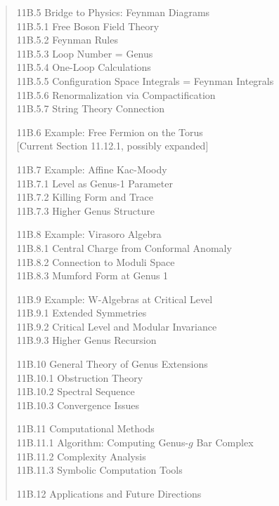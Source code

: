 \begin{quote}
11B.5 Bridge to Physics: Feynman Diagrams \\
\phantom{11B.5} 11B.5.1 Free Boson Field Theory \\
\phantom{11B.5} 11B.5.2 Feynman Rules \\
\phantom{11B.5} 11B.5.3 Loop Number = Genus \\
\phantom{11B.5} 11B.5.4 One-Loop Calculations \\
\phantom{11B.5} 11B.5.5 Configuration Space Integrals = Feynman Integrals \\
\phantom{11B.5} 11B.5.6 Renormalization via Compactification \\
\phantom{11B.5} 11B.5.7 String Theory Connection

11B.6 Example: Free Fermion on the Torus \\
\phantom{11B.6} [Current Section 11.12.1, possibly expanded]

11B.7 Example: Affine Kac-Moody \\
\phantom{11B.7} 11B.7.1 Level as Genus-1 Parameter \\
\phantom{11B.7} 11B.7.2 Killing Form and Trace \\
\phantom{11B.7} 11B.7.3 Higher Genus Structure

11B.8 Example: Virasoro Algebra \\
\phantom{11B.8} 11B.8.1 Central Charge from Conformal Anomaly \\
\phantom{11B.8} 11B.8.2 Connection to Moduli Space \\
\phantom{11B.8} 11B.8.3 Mumford Form at Genus 1

11B.9 Example: W-Algebras at Critical Level \\
\phantom{11B.9} 11B.9.1 Extended Symmetries \\
\phantom{11B.9} 11B.9.2 Critical Level and Modular Invariance \\
\phantom{11B.9} 11B.9.3 Higher Genus Recursion

11B.10 General Theory of Genus Extensions \\
\phantom{11B.10} 11B.10.1 Obstruction Theory \\
\phantom{11B.10} 11B.10.2 Spectral Sequence \\
\phantom{11B.10} 11B.10.3 Convergence Issues

11B.11 Computational Methods \\
\phantom{11B.11} 11B.11.1 Algorithm: Computing Genus-$g$ Bar Complex \\
\phantom{11B.11} 11B.11.2 Complexity Analysis \\
\phantom{11B.11} 11B.11.3 Symbolic Computation Tools

11B.12 Applications and Future Directions
\end{quote}

